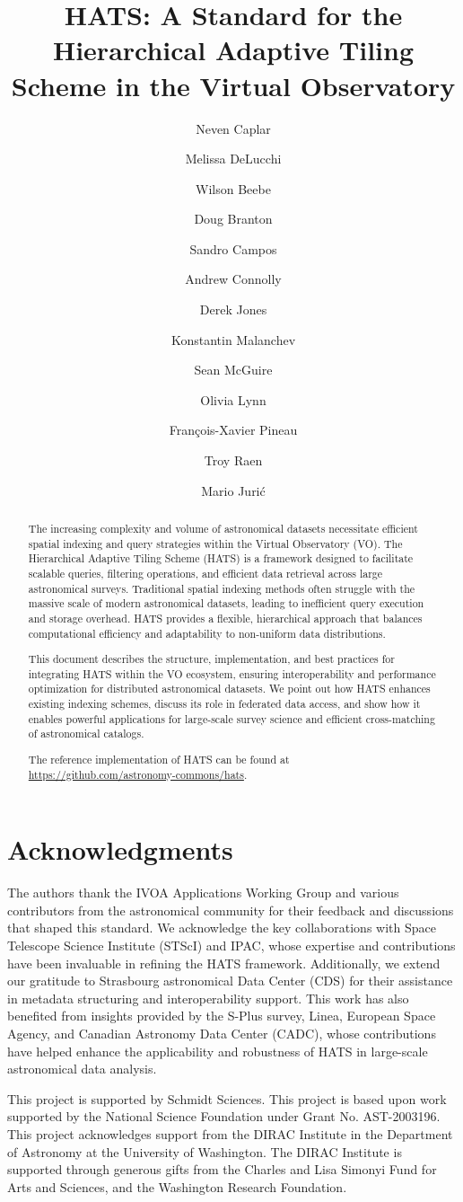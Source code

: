 \documentclass[11pt,a4paper]{ivoa}
\title{HATS: A Standard for the Hierarchical Adaptive Tiling Scheme in the Virtual Observatory}
\author[https://www.ivoa.net/authors/caplar]{Neven Caplar}
\author[https://www.ivoa.net/authors/delucchi]{Melissa DeLucchi}
\author[https://www.ivoa.net/authors/beebe]{Wilson Beebe}
\author[https://www.ivoa.net/authors/branton]{Doug Branton}
\author[https://www.ivoa.net/authors/campos]{Sandro Campos}
\author[https://www.ivoa.net/authors/connolly]{Andrew Connolly}
\author[https://www.ivoa.net/authors/jones]{Derek Jones}
\author[https://www.ivoa.net/authors/malanchev]{Konstantin Malanchev}
\author[https://www.ivoa.net/authors/mcguire]{Sean McGuire}
\author[https://www.ivoa.net/authors/lynn]{Olivia Lynn}
\author[https://www.ivoa.net/authors/pineau]{François-Xavier Pineau}
\author[https://www.ivoa.net/authors/raen]{Troy Raen}
\author[https://www.ivoa.net/authors/juric]{Mario Juri\'{c}}
\begin{document}
\begin{abstract}
The increasing complexity and volume of astronomical datasets necessitate efficient spatial indexing and query strategies within the Virtual Observatory (VO). 
The Hierarchical Adaptive Tiling Scheme (HATS) is a framework designed to facilitate scalable queries, filtering operations, and efficient data retrieval across large astronomical surveys. 
Traditional spatial indexing methods often struggle with the massive scale of modern astronomical datasets, leading to inefficient query execution and storage overhead. 
HATS provides a flexible, hierarchical approach that balances computational efficiency and adaptability to non-uniform data distributions.\par

This document describes the structure, implementation, and best practices for integrating HATS within the VO ecosystem, ensuring interoperability and performance optimization for distributed astronomical datasets. We point out how HATS enhances existing indexing schemes, discuss its role in federated data access, and show how it enables powerful applications for large-scale survey science and efficient cross-matching of astronomical catalogs. \par 
The reference implementation of HATS can be found at \url{https://github.com/astronomy-commons/hats}. 

\end{abstract}

\section*{Acknowledgments}
The authors thank the IVOA Applications Working Group and various contributors from the astronomical community for their feedback and discussions that shaped this standard. 
We acknowledge the key collaborations with Space Telescope Science Institute (STScI) and IPAC, whose expertise and contributions have been invaluable in refining the HATS framework. 
Additionally, we extend our gratitude to  Strasbourg astronomical Data Center (CDS) for their assistance in metadata structuring and interoperability support. 
This work has also benefited from insights provided by the S-Plus survey, Linea, European Space Agency, and Canadian Astronomy Data Center (CADC), whose contributions have helped enhance the applicability and robustness of HATS in large-scale astronomical data analysis. \par

This project is supported by Schmidt Sciences.
This project is based upon work supported by the National Science Foundation under Grant No. AST-2003196.
This project acknowledges support from the DIRAC Institute in the Department of Astronomy at the University of Washington. The DIRAC Institute is supported through generous gifts from the Charles and Lisa Simonyi Fund for Arts and Sciences, and the Washington Research Foundation.
\end{document}
